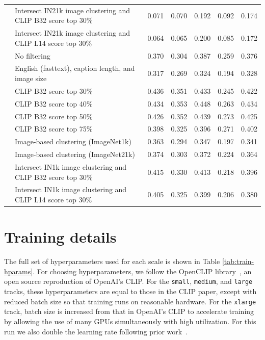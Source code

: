 \begin{table}
{\begin{tabular}{llccccc}
\cellcolor{white} & Intersect IN21k image clustering and CLIP B32 score top 30\%	 & 0.071 & 0.070 & 0.192 & 0.092 & 0.174 \\
\cellcolor{white} \multirow{-36}{*}{{\small \texttt{small}}}& Intersect IN21k image clustering and CLIP L14 score top 30\%	 & 0.064 & 0.065 & 0.200 & 0.085 & 0.172 \\
\midrule
\cellcolor{white} & No filtering	 & 0.370 & 0.304 & 0.387 & 0.259 & 0.376 \\
\cellcolor{white} & English (fasttext), caption length, and image size	 & 0.317 & 0.269 & 0.324 & 0.194 & 0.328 \\
\cellcolor{white} & CLIP B32 score top 30\%	 & 0.436 & 0.351 & 0.433 & 0.245 & 0.422 \\
\cellcolor{white} & CLIP B32 score top 40\%	 & 0.434 & 0.353 & 0.448 & 0.263 & 0.434  \\
\cellcolor{white} & CLIP B32 score top 50\%	 & 0.426 & 0.352 & 0.439 & 0.273 & 0.425 \\
\cellcolor{white} & CLIP B32 score top 75\%	 & 0.398 & 0.325 & 0.396 & 0.271 & 0.402 \\
\cellcolor{white} & Image-based clustering (ImageNet1k)	 & 0.363 & 0.294 & 0.347 & 0.197 & 0.341 \\
\cellcolor{white} & Image-based clustering (ImageNet21k)	 & 0.374 & 0.303 & 0.372 & 0.224 & 0.364 \\
\cellcolor{white} & Intersect IN1k image clustering and CLIP B32 score top 30\%	 & 0.415 & 0.330 & 0.413 & 0.218 & 0.396 \\
\cellcolor{white} \multirow{-10}{*}{{\small \texttt{medium}}}& Intersect IN1k image clustering and CLIP L14 score top 30\%	 & 0.405 & 0.325 & 0.399 & 0.206 & 0.380 \\
\bottomrule
\end{tabular}}
\label{tab:app_steps}
\vspace{3pt}
\end{table}


\FloatBarrier

\section{Training details}
\label{app:train}

The full set of hyperparameters used for each scale is shown in Table \ref{tab:train-hparams}.
For choosing hyperparameters, we follow the OpenCLIP library~\cite{ilharco2021openclip}, an open source reproduction of OpenAI's CLIP. For the \texttt{small}, \texttt{medium}, and \texttt{large} tracks, these hyperparameters are equal to those in the CLIP paper, except with reduced batch size so that training runs on reasonable hardware. For the \texttt{xlarge} track, batch size is increased from that in OpenAI's CLIP to accelerate training by allowing the use of many GPUs simultaneously with high utilization. For this run we also double the learning rate following prior work~\cite{cherti2022reproducible}.

